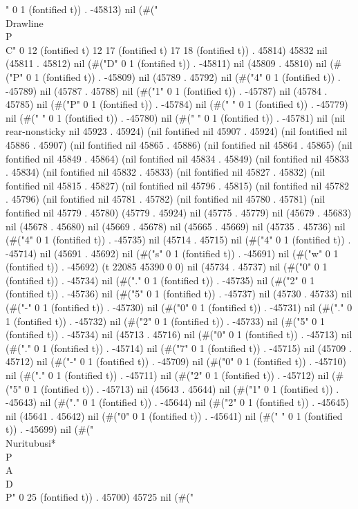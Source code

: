 " 0 1 (fontified t)) . -45813) nil (#("   \\Drawline{\\P\\C}" 0 12 (fontified t) 12 17 (fontified t) 17 18 (fontified t)) . 45814) 45832 nil (45811 . 45812) nil (#("D" 0 1 (fontified t)) . -45811) nil (45809 . 45810) nil (#("P" 0 1 (fontified t)) . -45809) nil (45789 . 45792) nil (#("4" 0 1 (fontified t)) . -45789) nil (45787 . 45788) nil (#("1" 0 1 (fontified t)) . -45787) nil (45784 . 45785) nil (#("P" 0 1 (fontified t)) . -45784) nil (#(" " 0 1 (fontified t)) . -45779) nil (#(" " 0 1 (fontified t)) . -45780) nil (#(" " 0 1 (fontified t)) . -45781) nil (nil rear-nonsticky nil 45923 . 45924) (nil fontified nil 45907 . 45924) (nil fontified nil 45886 . 45907) (nil fontified nil 45865 . 45886) (nil fontified nil 45864 . 45865) (nil fontified nil 45849 . 45864) (nil fontified nil 45834 . 45849) (nil fontified nil 45833 . 45834) (nil fontified nil 45832 . 45833) (nil fontified nil 45827 . 45832) (nil fontified nil 45815 . 45827) (nil fontified nil 45796 . 45815) (nil fontified nil 45782 . 45796) (nil fontified nil 45781 . 45782) (nil fontified nil 45780 . 45781) (nil fontified nil 45779 . 45780) (45779 . 45924) nil (45775 . 45779) nil (45679 . 45683) nil (45678 . 45680) nil (45669 . 45678) nil (45665 . 45669) nil (45735 . 45736) nil (#("4" 0 1 (fontified t)) . -45735) nil (45714 . 45715) nil (#("4" 0 1 (fontified t)) . -45714) nil (45691 . 45692) nil (#("s" 0 1 (fontified t)) . -45691) nil (#("w" 0 1 (fontified t)) . -45692) (t 22085 45390 0 0) nil (45734 . 45737) nil (#("0" 0 1 (fontified t)) . -45734) nil (#("." 0 1 (fontified t)) . -45735) nil (#("2" 0 1 (fontified t)) . -45736) nil (#("5" 0 1 (fontified t)) . -45737) nil (45730 . 45733) nil (#("-" 0 1 (fontified t)) . -45730) nil (#("0" 0 1 (fontified t)) . -45731) nil (#("." 0 1 (fontified t)) . -45732) nil (#("2" 0 1 (fontified t)) . -45733) nil (#("5" 0 1 (fontified t)) . -45734) nil (45713 . 45716) nil (#("0" 0 1 (fontified t)) . -45713) nil (#("." 0 1 (fontified t)) . -45714) nil (#("7" 0 1 (fontified t)) . -45715) nil (45709 . 45712) nil (#("-" 0 1 (fontified t)) . -45709) nil (#("0" 0 1 (fontified t)) . -45710) nil (#("." 0 1 (fontified t)) . -45711) nil (#("2" 0 1 (fontified t)) . -45712) nil (#("5" 0 1 (fontified t)) . -45713) nil (45643 . 45644) nil (#("1" 0 1 (fontified t)) . -45643) nil (#("." 0 1 (fontified t)) . -45644) nil (#("2" 0 1 (fontified t)) . -45645) nil (45641 . 45642) nil (#("0" 0 1 (fontified t)) . -45641) nil (#("
" 0 1 (fontified t)) . -45699) nil (#("   \\Nuritubusi*{\\P\\A\\D\\P}" 0 25 (fontified t)) . 45700) 45725 nil (#("
